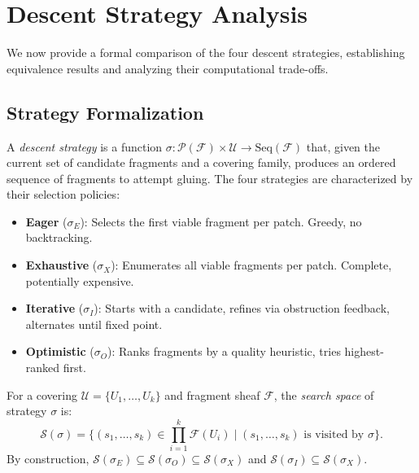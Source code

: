 \documentclass[11pt]{article}
\newcommand{\FragmentSpace}{\mathcal{F}}
\begin{document}
\section{Descent Strategy Analysis}\label{sec:strategy-analysis}

We now provide a formal comparison of the four descent strategies,
establishing equivalence results and analyzing their computational
trade-offs.

\subsection{Strategy Formalization}

\begin{definition}\label{def:descent-strategy}
A \emph{descent strategy} is a function
$\sigma : \mathcal{P}(\FragmentSpace) \times \mathcal{U} \to
\mathrm{Seq}(\FragmentSpace)$ that, given the current set of
candidate fragments and a covering family, produces an ordered
sequence of fragments to attempt gluing.  The four strategies
are characterized by their selection policies:
\begin{itemize}[noitemsep]
  \item \textbf{Eager} ($\sigma_E$): Selects the first viable
        fragment per patch.  Greedy, no backtracking.
  \item \textbf{Exhaustive} ($\sigma_X$): Enumerates all viable
        fragments per patch.  Complete, potentially expensive.
  \item \textbf{Iterative} ($\sigma_I$): Starts with a candidate,
        refines via obstruction feedback, alternates until fixed point.
  \item \textbf{Optimistic} ($\sigma_O$): Ranks fragments by a
        quality heuristic, tries highest-ranked first.
\end{itemize}
\end{definition}

\begin{definition}\label{def:search-space}
For a covering $\mathcal{U} = \{U_1, \ldots, U_k\}$ and fragment
sheaf $\FragmentSpace$, the \emph{search space} of strategy $\sigma$
is:
\[
  \mathcal{S}(\sigma) = \bigl\{
    (s_1, \ldots, s_k) \in \prod_{i=1}^k \FragmentSpace(U_i)
    \;\big|\;
    (s_1, \ldots, s_k) \text{ is visited by } \sigma
  \bigr\}.
\]
By construction, $\mathcal{S}(\sigma_E) \subseteq
\mathcal{S}(\sigma_O) \subseteq \mathcal{S}(\sigma_X)$ and
$\mathcal{S}(\sigma_I) \subseteq \mathcal{S}(\sigma_X)$.
\end{definition}
\end{document}
